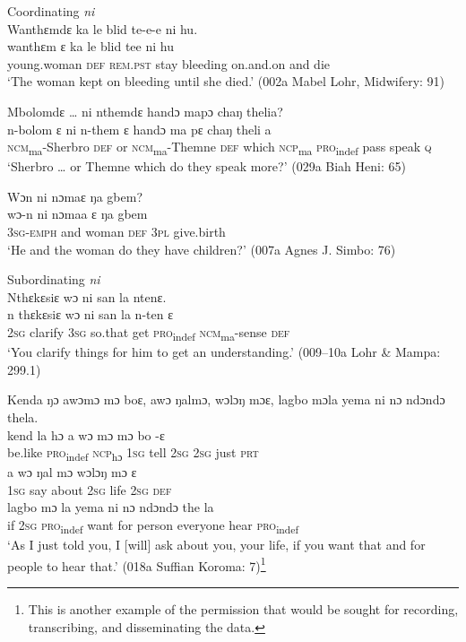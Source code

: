 \ea%
  \label{ex:101}
  Coordinating \textit{ni}\\
  \ea Wanthɛmdɛ ka le blid te-e-e ni hu.\\
  \gll wanthɛm      ɛ    ka      le    blid      tee        ni    hu\\
  young.woman  \textsc{def}  \textsc{rem.pst}  stay  bleeding    on.and.on  and  die\\
  \glt ‘The woman kept on bleeding until she died.' (002a Mabel Lohr, Midwifery: 91)

\newpage
  \ex Mbolomdɛ … ni nthemdɛ handɔ mapɔ chaŋ thelia?\\
  \gll n-bolom        ɛ     ni    n-them        ɛ    handɔ    ma    pɛ      chaŋ  theli a\\
  \textsc{ncm}\textsubscript{ma}{}-Sherbro  \textsc{def}  or    \textsc{ncm}\textsubscript{ma}{}-Themne  \textsc{def}  which  \textsc{ncp}\textsubscript{ma}   \textsc{pro}\textsubscript{indef}  pass  speak  \textsc{q}\\
  \glt ‘Sherbro … or Themne which do they speak more?' (029a Biah Heni: 65)

  \ex Wɔn ni nɔmaɛ ŋa gbem?\\
  \gll wɔ{}-n      ni    nɔmaa  ɛ    ŋa    gbem\\
  \textsc{3sg}{}-\textsc{emph}  and  woman  \textsc{def}  \textsc{3pl}  give.birth\\
  \glt ‘He and the woman do they have children?' (007a Agnes J. Simbo: 76)
\z
\z

\ea%
  \label{ex:102}
  Subordinating \textit{ni}\\
  \ea Nthɛkɛsiɛ wɔ   ni san la ntenɛ.\\
  \gll n    thɛkɛsiɛ  wɔ    ni      san  la      n-ten        ɛ\\
  \textsc{2sg}  clarify  \textsc{3sg}  so.that  get  \textsc{pro}\textsubscript{indef}  \textsc{ncm}\textsubscript{ma}{}-sense  \textsc{def}\\
  \glt ‘You clarify things for him to get an understanding.' (009--10a Lohr \& Mampa: 299.1)

  \ex Kenda ŋɔ awɔmɔ mɔ boɛ, awɔ ŋalmɔ, wɔlɔŋ mɔɛ, lagbo mɔla yema ni nɔ ndɔndɔ thela.\\
  \gll kend    la      hɔ      a    wɔ    mɔ  mɔ  bo    {}-ɛ\\
  be.like  \textsc{pro}\textsubscript{indef}  \textsc{ncp}\textsubscript{hɔ}    \textsc{1sg}  tell  \textsc{2sg}  \textsc{2sg}  just  \textsc{prt}\\
  \gll a    wɔ    ŋal    mɔ    wɔlɔŋ    mɔ  ɛ\\
  1\textsc{sg}  say  about    \textsc{2sg}    life    \textsc{2sg}  \textsc{def}\\
  \gll lagbo  mɔ  la      yema    ni    nɔ      ndɔndɔ    the  la\\
  if    \textsc{2sg}  \textsc{pro}\textsubscript{indef}  want    for    person  everyone  hear  \textsc{pro}\textsubscript{indef}\\
  \glt ‘As I just told you, I [will] ask about you, your life, if you want that and for people to hear that.' (018a Suffian Koroma: 7)\footnote{This is another example of the permission that would be sought for recording, transcribing, and disseminating the data.}
\z
\z

